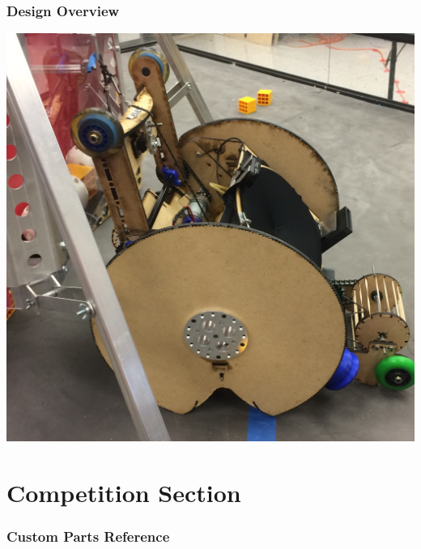 \documentclass[
letterpaper, %
11pt, %
onecolumn, %
openany, %
]{dndbook}
\begin{document}
\section{Design Overview}
\vspace{3em}
\begin{minipage}[c]{\linewidth}
\centering
\includegraphics[width=\linewidth]{Images/RobotPics/janbigwheel.jpg}
\end{minipage}








\cleardoublepage




\part{Competition Section}

% 
% 
% 
% 
% 
\cleardoublepage
{}
\appendix

\section{Custom Parts Reference}



\listoffigures
\end{document}
